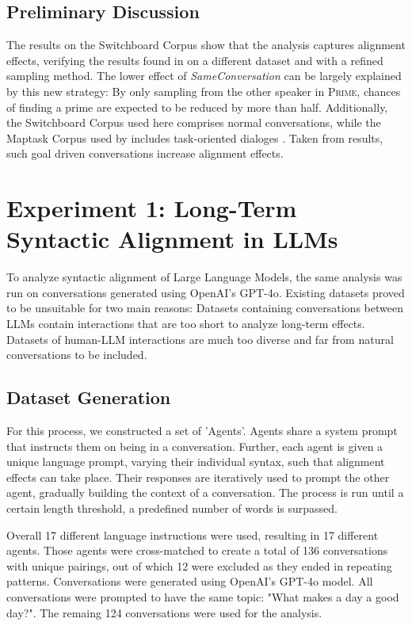 \documentclass[11pt]{article}
\begin{document}
\subsection{Preliminary Discussion}
The results on the Switchboard Corpus show that the analysis captures alignment effects, verifying the results found in \citealp{reitter2008context} on a different dataset and with a refined sampling method.
The lower effect of \textit{SameConversation}
can be largely explained by this new strategy: By only sampling from the other speaker in \textsc{Prime}, chances of finding a prime are expected to be reduced by more than half. 
Additionally, the Switchboard Corpus used here comprises normal conversations, while the Maptask Corpus used by \citealp{reitter2008context} includes task-oriented dialoges \cite{anderson1991}. Taken from  results, such goal driven conversations increase alignment effects.

\section{Experiment 1: Long-Term Syntactic Alignment in LLMs}\label{sec:experiment1}
To analyze syntactic alignment of Large Language Models, the same analysis was run on conversations generated using OpenAI's GPT-4o. Existing datasets proved to be unsuitable for two main reasons: Datasets containing conversations between LLMs contain interactions that are too short to analyze long-term effects. Datasets of human-LLM interactions are much too diverse and far from natural conversations to be included.

\subsection{Dataset Generation}
For this process, we constructed a set of 'Agents'. Agents share a system prompt that instructs them on being in a conversation. Further, each agent is given a unique language prompt, varying their individual syntax, such that alignment effects can take place. Their responses are iteratively used to prompt the other agent, gradually building the context of a conversation. The process is run until a certain length threshold, a predefined number of words is surpassed.

Overall 17 different language instructions were used, resulting in 17 different agents. Those agents were cross-matched to create a total of 136 conversations with unique pairings, out of which 12 were excluded as they ended in repeating patterns. Conversations were generated using OpenAI's GPT-4o model. All conversations were prompted to have the same topic: "What makes a day a good day?". The remaing 124 conversations were used for the analysis.
\end{document}
